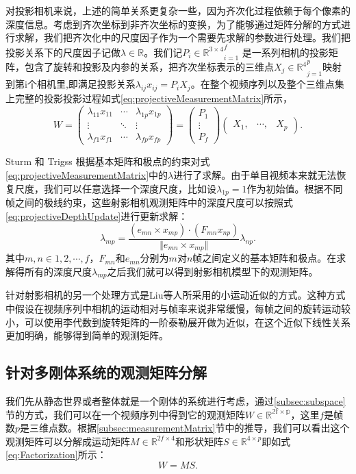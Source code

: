 对投影相机来说，上述的简单关系更复杂一些，因为齐次化过程依赖于每个像素的深度信息。考虑到齐次坐标到非齐次坐标的变换，为了能够通过矩阵分解的方式进行求解，我们把齐次化中的尺度因子作为一个需要先求解的参数进行处理。我们把投影关系下的尺度因子记做$\lambda\in \mathbb{R}$。我们记${P_i\in \mathbb{R}^{3\times4}}_{i=1}^f$ 是一系列相机的投影矩阵，包含了旋转和投影及内参的关系，把齐次坐标表示的三维点${X_j\in \mathbb{R}^4}_{j=1}^p$映射到第i个相机里,即满足投影关系$\lambda_{ij}x_{ij}=P_i X_j$。在整个视频序列以及整个三维点集上完整的投影投影过程如式\eqref{eq:projectiveMeasurementMatrix}所示，
\begin{equation}\label{eq:projectiveMeasurementMatrix}
W=
\begin{pmatrix}
\lambda_{11}x_{11}&\cdots&\lambda_{1p}x_{1p}\\
\vdots&\ddots & \vdots\\
\lambda_{f1}x_{f1}&\cdots&\lambda_{fp}x_{fp}
\end{pmatrix}
=
\begin{pmatrix}
P_1\\
\vdots\\
P_f
\end{pmatrix}
\begin{pmatrix}
X_1,&\cdots,&X_p
\end{pmatrix}.
\end{equation}

Sturm 和 Trigss\cite{wx-ref} 根据基本矩阵和极点的约束对式\eqref{eq:projectiveMeasurementMatrix}中的$\lambda$进行了求解。由于单目视频本来就无法恢复尺度，我们可以任意选择一个深度尺度，比如设$\lambda_{1p}=1$作为初始值。根据不同帧之间的极线约束，这些射影相机观测矩阵中的深度尺度可以按照式\eqref{eq:projectiveDepthUpdate}进行更新求解：
\begin{equation}\label{eq:projectiveDepthUpdate}
\lambda_{mp}=\frac{(e_{mn}\times x_{mp})\cdot(F_{mn}x_{np})}{\Vert e_{mn}\times x_{mp}\Vert}\lambda_{np}.
\end{equation} 
其中$m,n\in{1,2,\cdots,f}$，$F_{mn}$和$e_{mn}$分别为$m$对$n$帧之间定义的基本矩阵和极点。在求解得所有的深度尺度$\lambda_{mp}$之后我们就可以得到射影相机模型下的观测矩阵。

针对射影相机的另一个处理方式是Liu等人\cite{wx-ref}所采用的小运动近似的方式。这种方式中假设在视频序列中相机的运动相对与帧率来说非常缓慢，每帧之间的旋转运动较小，可以使用李代数到旋转矩阵的一阶泰勒展开做为近似，在这个近似下线性关系更加明确，能够得到简单的观测矩阵。
\subsection{针对多刚体系统的观测矩阵分解}
我们先从静态世界或者整体就是一个刚体的系统进行考虑，通过\ref{subsec:subspace}节的方式，我们可以在一个视频序列中得到它的观测矩阵$W\in \mathbb{R^{2f\times p}}$，这里$f$是帧数$p$是三维点数。根据\ref{subsec:measurementMatrix}节中的推导，我们可以看出这个观测矩阵可以分解成运动矩阵$M\in \mathbb{R}^{2f\times 4}$和形状矩阵$S\in\mathbb{R}^{4\times p}$即如式\eqref{eq:Factorization}所示：
\begin{equation}\label{eq:Factorization}
W=M S .
\end{equation}

